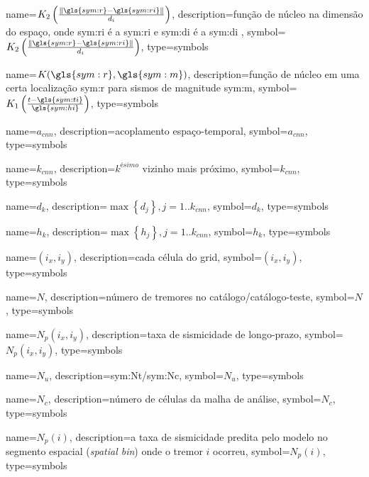 {
	name={\ensuremath{K_2 \left( \frac{ \| \gls{sym:r} - \gls{sym:ri} \| }{d_i} \right) }},
	description={função de núcleo na dimensão do espaço, onde
					\gls{sym:ri} é a \glsdesc{sym:ri} e
					\gls{sym:di} é a \glsdesc{sym:di}
	},
	symbol={\ensuremath{K_2 \left( \frac{ \| \gls{sym:r} - \gls{sym:ri} \| }{d_i} \right)}},
	type=symbols
}


{
	name={\ensuremath{K(\gls{sym:r},\gls{sym:m})}},
	description={função de núcleo em uma certa localização \gls{sym:r} para sismos de magnitude \gls{sym:m}},
	symbol={\ensuremath{K_1 \left( \frac{ t - \gls{sym:ti} }{ \gls{sym:hi} } \right)}},
	type=symbols
}

{
	name={\ensuremath{a_{cnn}}},
	description={acoplamento espaço-temporal},
	symbol={\ensuremath{a_{cnn}}},
	type=symbols
}

{
	name={\ensuremath{k_{cnn}}},
	description={$k^{ésimo}$ vizinho mais próximo},
	symbol={\ensuremath{k_{cnn}}},
	type=symbols
}


{
	name={\ensuremath{d_k}},
	description={$\max{\left\{ d_j \right\}}, j=1.. k_{cnn}$},
	symbol={\ensuremath{d_k}},
	type=symbols
}

{
	name={\ensuremath{h_k}},
	description={$\max{\left\{ h_j \right\} }, j=1.. k_{cnn}$},
	symbol={\ensuremath{h_k}},
	type=symbols
}

{
	name={\ensuremath{\left(i_x, i_y\right)}},
	description={cada célula do grid},
	symbol={\ensuremath{\left(i_x, i_y\right)}},
	type=symbols
}


{
	name={\ensuremath{N}},
	description={número de tremores no catálogo/catálogo-teste},
	symbol={\ensuremath{N}},
	type=symbols
}



{
	name={\ensuremath{N_p\left(i_x, i_y\right)}},
	description={taxa de sismicidade de longo-prazo},
	symbol={\ensuremath{N_p\left(i_x, i_y\right)}},
	type=symbols
}


{
	name={\ensuremath{N_u}},
	description={\gls{sym:Nt}/\gls{sym:Nc}},
	symbol={\ensuremath{N_u}},
	type=symbols
}


{
	name={\ensuremath{N_c}},
	description={número de células da malha de análise},
	symbol={\ensuremath{N_c}},
	type=symbols
}


{
	name={\ensuremath{N_p(i)}},
	description={a taxa de sismicidade predita pelo modelo no segmento espacial (\emph{spatial bin}) onde o tremor $i$
	ocorreu}, symbol={\ensuremath{N_p(i)}},
	type=symbols
}


